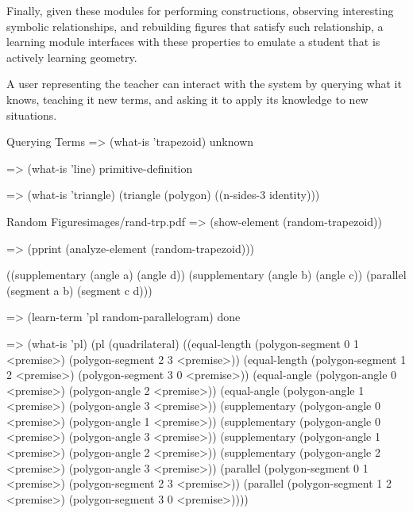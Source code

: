 Finally, given these modules for performing constructions, observing
interesting symbolic relationships, and rebuilding figures that
satisfy such relationship, a learning module interfaces with these
properties to emulate a student that is actively learning geometry.

A user representing the teacher can interact with the system by
querying what it knows, teaching it new terms, and asking it to apply
its knowledge to new situations.

\begin{repl-example}{Querying Terms}
=> (what-is 'trapezoid)
unknown

=> (what-is 'line)
primitive-definition

=> (what-is 'triangle)
(triangle (polygon)
          ((n-sides-3 identity)))
\end{repl-example}

\begin{pdf-example}
[comment style={frame hidden,opacityback=0,
raster columns=3,graphics pages={1,2,3}}]
{Random Figures}{images/rand-trp.pdf}
=> (show-element (random-trapezoid))
\end{pdf-example}

\begin{repl-example}
=> (pprint (analyze-element (random-trapezoid)))

((supplementary (angle a) (angle d))
 (supplementary (angle b) (angle c))
 (parallel (segment a b) (segment c d)))
\end{repl-example}

\begin{repl-example}
=> (learn-term 'pl random-parallelogram)
done

=> (what-is 'pl)
(pl
 (quadrilateral)
 ((equal-length (polygon-segment 0 1 <premise>)
                (polygon-segment 2 3 <premise>))
  (equal-length (polygon-segment 1 2 <premise>)
                (polygon-segment 3 0 <premise>))
  (equal-angle (polygon-angle 0 <premise>)
               (polygon-angle 2 <premise>))
  (equal-angle (polygon-angle 1 <premise>)
               (polygon-angle 3 <premise>))
  (supplementary (polygon-angle 0 <premise>)
                 (polygon-angle 1 <premise>))
  (supplementary (polygon-angle 0 <premise>)
                 (polygon-angle 3 <premise>))
  (supplementary (polygon-angle 1 <premise>)
                 (polygon-angle 2 <premise>))
  (supplementary (polygon-angle 2 <premise>)
                 (polygon-angle 3 <premise>))
  (parallel (polygon-segment 0 1 <premise>)
            (polygon-segment 2 3 <premise>))
  (parallel (polygon-segment 1 2 <premise>)
            (polygon-segment 3 0 <premise>))))
\end{repl-example}

